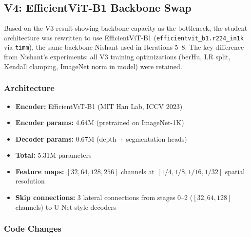 \documentclass[11pt,a4paper]{article}
\begin{document}
\subsection{V4: EfficientViT-B1 Backbone Swap}
\label{sec:vivek-v4}

Based on the V3 result showing backbone capacity as the bottleneck,
the student architecture was rewritten to use EfficientViT-B1
(\texttt{efficientvit\_b1.r224\_in1k} via \texttt{timm}), the same backbone
Nishant used in Iterations 5--8. The key difference from Nishant's experiments:
all V3 training optimizations (berHu, LR split, Kendall clamping, ImageNet
norm in model) were retained.

\subsubsection{Architecture}

\begin{itemize}[nosep]
  \item \textbf{Encoder:} EfficientViT-B1 (MIT Han Lab, ICCV 2023)
  \item \textbf{Encoder params:} 4.64M (pretrained on ImageNet-1K)
  \item \textbf{Decoder params:} 0.67M (depth + segmentation heads)
  \item \textbf{Total:} 5.31M parameters
  \item \textbf{Feature maps:} $[32, 64, 128, 256]$ channels at
    $[1/4, 1/8, 1/16, 1/32]$ spatial resolution
  \item \textbf{Skip connections:} 3 lateral connections from stages 0--2
    ($[32, 64, 128]$ channels) to U-Net-style decoders
\end{itemize}

\subsubsection{Code Changes}
\end{document}
